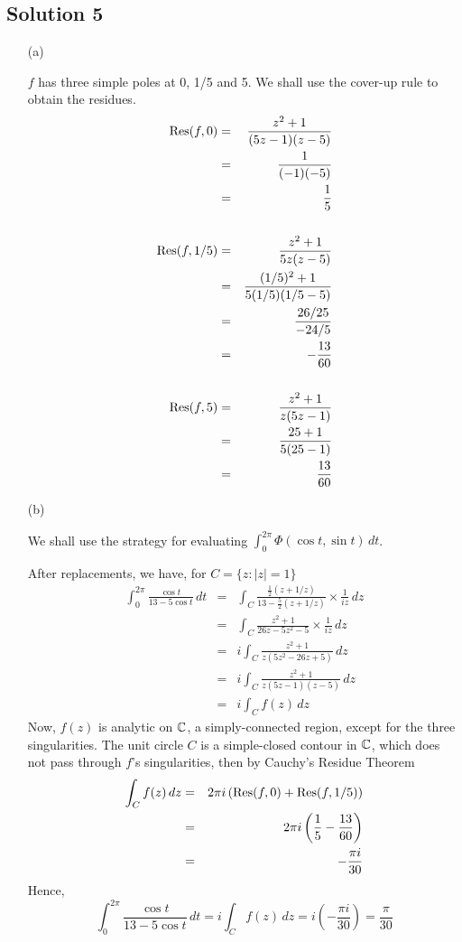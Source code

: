\subsection*{Solution 5}

\begin{itemize}
\item[(a)]

$f$ has three simple poles at 0, 1/5 and 5. We shall use the cover-up
rule to obtain the residues.
\begin{eqnarray*}
{\rm Res}(f, 0)
	&=& \frac{ z^2+1 }{ (5z-1)(z-5) } \\
	&=& \frac{1}{(-1)(-5)} \\
	&=& \frac{1}{5} \\
\\
{\rm Res}(f, 1/5)
	&=& \frac{ z^2+1 }{ 5z(z-5) } \\
	&=& \frac{ (1/5)^2+1 }{ 5(1/5)(1/5-5) } \\
	&=& \frac{ 26/25 }{ -24/5 } \\
	&=& -\frac{13}{60} \\
\\
{\rm Res}(f, 5)
	&=& \frac{ z^2+1 }{ z(5z-1) } \\
	&=& \frac{ 25+1 }{ 5(25-1) } \\
	&=& \frac{13}{60}
\end{eqnarray*}

\item[(b)]

We shall use the strategy for evaluating
$\int_0^{2\pi}\Phi(\cos t, \sin t)\,dt$.

After replacements, we have, for $C=\{z:|z|=1\}$
\begin{eqnarray*}
\int_0^{2\pi} \frac{ \cos t }{ 13-5\cos t }\,dt
	&=& \int_C \frac{ \frac{1}{2}(z+1/z) }{ 13-\frac{5}{2}(z+1/z) } \times \frac{1}{iz}\,dz \\
	&=& \int_C \frac{ z^2+1 }{ 26z-5z^2-5 } \times \frac{1}{iz}\,dz \\
	&=& i \int_C \frac{ z^2+1 }{ z(5z^2-26z+5) }\,dz \\
	&=& i \int_C \frac{ z^2+1 }{ z(5z-1)(z-5) }\,dz \\
	&=& i \int_C f(z)\,dz
\end{eqnarray*}
Now, $f(z)$ is analytic on $\mathbb{C}$, a simply-connected region,
except for the three singularities. The unit circle $C$ is a
simple-closed contour in $\mathbb{C}$, which does not pass through $f$'s
singularities, then by Cauchy's Residue Theorem
\begin{eqnarray*}
\int_C f(z)\,dz
	&=& 2\pi i\left({\rm Res}(f,0)+{\rm Res}(f,1/5)\right) \\
	&=& 2\pi i\left(\frac{1}{5}-\frac{13}{60}\right) \\
	&=& -\frac{\pi i}{30}
\end{eqnarray*}
Hence,
\[
\int_0^{2\pi} \frac{ \cos t }{ 13-5\cos t }\,dt
	= i \int_C f(z)\,dz
	= i \left( -\frac{\pi i}{30} \right)
	= \frac{\pi}{30}
\]

\end{itemize}

